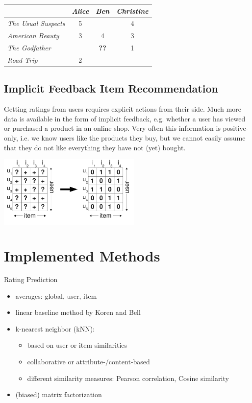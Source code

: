 \documentclass[a4paper, foldmark, 12pt]{leaflet}
\newcommand{\UserI}{\textit{Alice}}
\newcommand{\UserII}{\textit{Ben}}
\newcommand{\UserIII}{\textit{Christine}}
\newcommand{\MovieI}{\textit{The Usual Suspects}}
\newcommand{\MovieII}{\textit{American Beauty}}
\newcommand{\MovieIII}{\textit{The Godfather}}
\newcommand{\MovieIV}{\textit{Road Trip}}
\begin{document}
\begin{center}
      \begin{tabular}{|l||c|c|c|}
        \hline
	           & \UserI & \UserII & \UserIII \\ \hline
	\hline
	\MovieI    &  5   &     & 4     \\ \hline
	\MovieII   &  3   & 4   & 3    \\ \hline
	\MovieIII  &      & \textbf{??}    & 1    \\ \hline
	\MovieIV   &  2   &     &        \\ \hline
      \end{tabular}
\end{center}


\subsection{Implicit Feedback Item Recommendation}

Getting ratings from users requires explicit actions from their side.
Much more data is available in the form of implicit feedback,
e.g. whether a user has viewed or purchased a product in an online shop.
Very often this information is positive-only,
i.e. we know users like the products they buy, but we cannot easily assume
that they do not like everything they have not (yet) bought.

\begin{center}
	\includegraphics[width=7.0cm]{fig/interpretation_single.pdf}
\end{center}

\newpage 

\section{Implemented Methods}
Rating Prediction
\begin{itemize}
	\item averages: global, user, item
	\item linear baseline method by Koren and Bell
	\item k-nearest neighbor (kNN):
		\begin{itemize}
			\item based on user or item similarities
			\item collaborative or attribute-/content-based
			\item different similarity measures: Pearson correlation, Cosine similarity
		\end{itemize}
	\item (biased) matrix factorization
\end{itemize}
\end{document}
